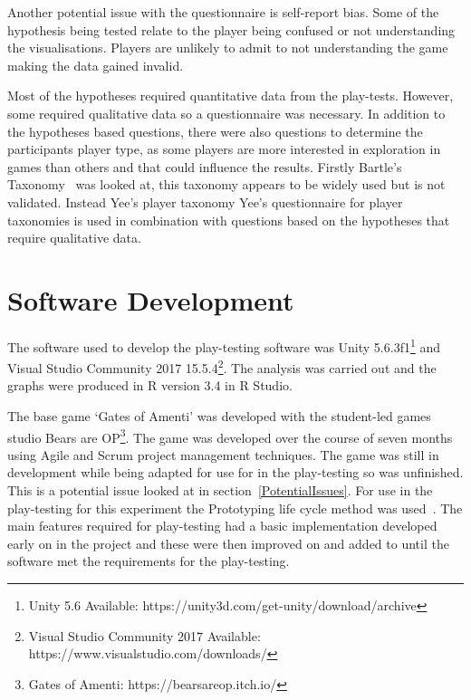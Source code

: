 \documentclass[journal]{IEEEtran}
\begin{document}
	Another potential issue with the questionnaire is self-report bias. Some of the hypothesis being tested relate to the player being confused or not understanding the visualisations. Players are unlikely to admit to not understanding the game making the data gained invalid. 
	
	Most of the hypotheses required quantitative data from the play-tests. However, some required qualitative data so a questionnaire was necessary.  In addition to the hypotheses based questions, there were also questions to determine the participants player type, as some players are more interested in exploration in games than others and that could influence the results. 
	Firstly Bartle's Taxonomy~\cite{Bartle1996} was looked at, this taxonomy appears to be widely used but is not validated. Instead Yee's player taxonomy 
	Yee's questionnaire for player taxonomies is used in combination with questions based on the hypotheses that require qualitative data. 
	
	\section{Software Development} \label{softdev}
	The software used to develop the play-testing software was Unity 5.6.3f1\footnote[3]{Unity 5.6 Available: https://unity3d.com/get-unity/download/archive} and Visual Studio Community 2017  15.5.4\footnote[4]{Visual Studio Community 2017 Available: https://www.visualstudio.com/downloads/}.  The analysis was carried out and the graphs were produced in R version 3.4 in R Studio.
	
	The base game `Gates of Amenti' was developed with the student-led games studio Bears are OP\footnote[5]{Gates of Amenti: https://bearsareop.itch.io/}. The game was developed over the course of seven months using Agile and Scrum project management techniques. The game was still in development while being adapted for use for in the play-testing so was unfinished. This is a potential issue looked at in section~\ref{PotentialIssues}. 
	For use in the play-testing for this experiment the Prototyping life cycle method was used~\cite{isaias2015}. The main features required for play-testing had a basic implementation developed early on in the project and these were then improved on and added to until the software met the requirements for the play-testing.
	
\end{document}
